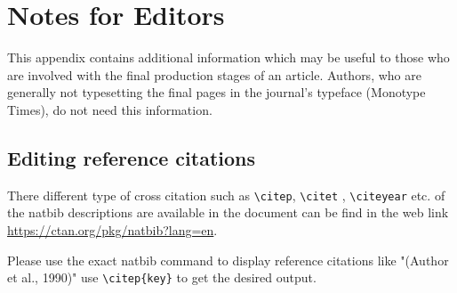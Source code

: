 \documentclass[lineno]{JFM-FLM_Au}
\begin{document}
\section{Notes for Editors}

This appendix contains additional information which may be useful to
those who are involved with the final production stages of an article.
Authors, who are generally not typesetting the final pages in the
journal's typeface (Monotype Times), do not need this information.


\subsection{Editing reference citations}

There different type of cross citation such as \verb"\citep",  \verb"\citet" , \verb"\citeyear"
etc. of the natbib descriptions are available in the document can be find in the web
link \url{https://ctan.org/pkg/natbib?lang=en}.

Please use the exact natbib command to display reference citations like \citep{Arntzenius2012} "(Author et al., 1990)" use \verb"\citep{key}" to get the desired output.
\end{document}
